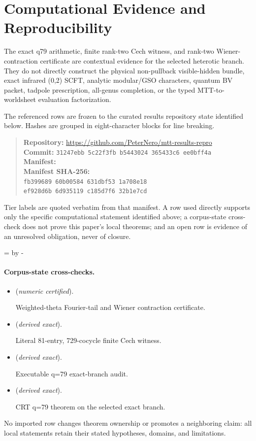 \documentclass[11pt]{article}
\theoremstyle{definition}
\theoremstyle{remark}
\begin{document}


\section*{Computational Evidence and Reproducibility}
The exact q79 arithmetic, finite rank-two Cech witness, and rank-two Wiener-contraction certificate are contextual evidence for the selected heterotic branch. They do not directly construct the physical non-pullback visible-hidden bundle, exact infrared (0,2) SCFT, analytic modular/GSO characters, quantum BV packet, tadpole prescription, all-genus completion, or the typed MTT-to-worldsheet evaluation factorization.

The referenced rows are frozen to the curated results repository state identified below. Hashes are grouped in eight-character blocks for line breaking.
\begin{quote}\small
\textbf{Repository:} \url{https://github.com/PeterNero/mtt-results-repro}\\
\textbf{Commit:} \texttt{31247ebb 5c22f3fb b5443024 365433c6 ee0bff4a}\\
\textbf{Manifest:} \\
\textbf{Manifest SHA-256:}\\
\texttt{fb399689 60b00584 631dbf53 1a708e18}\\
\texttt{ef928d6b 6d935119 c185d7f6 32b1e7cd}
\end{quote}

Tier labels are quoted verbatim from that manifest. A row used directly supports only the specific computational statement identified above; a corpus-state cross-check does not prove this paper's local theorems; and an open row is evidence of an unresolved obligation, never of closure.

\par\begingroup{}=\pagegoal\advance{} by -\pagetotal\ifdim\dimen0<7\baselineskip\newpage\fi\endgroup
\paragraph{Corpus-state cross-checks.}
\begin{itemize}
\setlength{\itemsep}{0.25em}
\item {} (\emph{numeric certified}).\par Weighted-theta Fourier-tail and Wiener contraction certificate.
\item {} (\emph{derived exact}).\par Literal 81-entry, 729-cocycle finite Cech witness.
\item {} (\emph{derived exact}).\par Executable q=79 exact-branch audit.
\item {} (\emph{derived exact}).\par CRT q=79 theorem on the selected exact branch.
\end{itemize}

No imported row changes theorem ownership or promotes a neighboring claim: all local statements retain their stated hypotheses, domains, and limitations.


\end{document}
